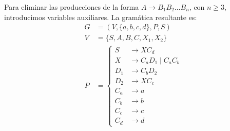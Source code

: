 \begin{ejercicio}
    Para eliminar las producciones de la forma $A\to B_1B_2\ldots B_n$, con $n\geq 3$, introducimos variables auxiliares. La gramática resultante es:
    \begin{equation*}
        \begin{aligned}
            G &= (V,\{a,b,c,d\},P,S) \\
            V &= \{ S, A, B, C, X_1, X_2 \} \\
            P &= \left\{
                \begin{aligned}
                    S &\rightarrow XC_d\\
                    X &\rightarrow C_aD_1 \mid C_aC_b\\
                    D_1 &\rightarrow C_bD_2\\
                    D_2 &\rightarrow XC_c\\
                    C_a &\rightarrow a\\
                    C_b &\rightarrow b\\
                    C_c &\rightarrow c\\
                    C_d &\rightarrow d
                \end{aligned}
            \right.
        \end{aligned}
    \end{equation*}
\end{ejercicio}

